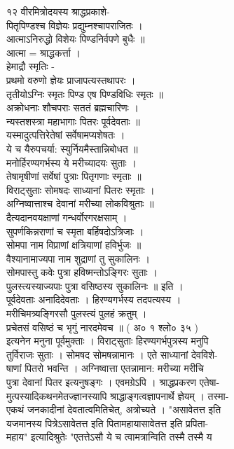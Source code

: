 \documentclass[11pt, openany]{book}
\begin{document}
{{{{{{{{{{{{{{{{{{{{{{{{{{{१२ वीरमित्रोदयस्य श्राद्धप्रकाशे-}{\\
पितृपिण्डश्च विज्ञेयः प्रद्युम्नश्चापराजितः ।\\
आत्माऽनिरुद्धो विशेयः पिण्डनिर्वपणे बुधैः ॥\\
आत्मा = श्राद्धकर्त्ता ।\\
हेमाद्रौ स्मृतिः -\\
प्रथमो वरुणो ज्ञेयः प्राजापत्यस्तथापरः ।\\
तृतीयोऽग्निः स्मृतः पिण्ड एष पिण्डविधिः स्मृतः ॥\\
अक्रोधनाः शौचपराः सततं ब्रह्मचारिणः ।\\
न्यस्तशस्त्रा महाभागाः पितरः पूर्वदेवताः ॥\\
यस्मादुत्पत्तिरेतेषां सर्वेषामप्यशेषतः ।\\
ये }{च}{ यैरुपचर्या: स्युर्नियमैस्तान्निबोधत ॥\\
मनोर्हिरण्यगर्भस्य ये मरीच्यादयः सुताः ।\\
तेषामृषीणां सर्वेषां पुत्राः पितृगणाः स्मृताः ॥\\
विराट्सुताः सोमषदः साध्यानां पितरः स्मृताः ।\\
अग्निष्वात्ताश्च देवानां मरीच्या लोकविश्रुताः ॥\\
दैत्यदानवयक्षाणां गन्धर्वोरगरक्षसाम् ।\\
सुपर्णकिन्नराणां }{च}{ स्मृता बर्हिषदोऽत्रिजाः ।\\
सोमपा नाम विप्राणां क्षत्रियाणां हविर्भुजः ॥\\
वैश्यानामाज्यपा नाम शुद्राणां तु सुकालिनः ।\\
सोमपास्तु कवेः पुत्रा हविष्मन्तोऽङ्गिरः सुताः ।\\
पुलस्त्यस्याज्यपाः पुत्रा वसिष्ठस्य सुकालिनः ॥ इति ।\\
पूर्वदेवताः अनादिदेवताः । हिरण्यगर्भस्य तदपत्यस्य ।\\
मरीचिमत्र्यङ्गिरसौ पुलस्त्यं पुलहं क्रतुम् ।\\
प्रचेतसं वसिष्ठं }{च}{ भृगुं नारदमेवच ॥ ( अ० १ श्लो० ३५ )\\
इत्यनेन मनुना पूर्वमुक्ताः । विराट्सुताः हिरण्यगर्भपुत्रस्य मनुपि\\
तुर्विराजः सुताः । सोमषद सोमषन्नामानः । एते साध्यानां देवविशे-\\
षाणां पितरो भवन्ति । अग्निष्वात्ता एतन्नामान: मरीच्या मरीचि\\
पुत्रा देवानां पितर इत्यनुषङ्गः । एवमग्रेऽपि । श्राद्धप्रकरण एतेषा-\\
मुत्पस्यादिकथनमेतज्ज्ञानस्यापि श्राद्धाङ्गत्वज्ञापनार्थे ज्ञेयम् ।
तस्मा-\\
एकथं जनकादीनां देवतात्वमितिचेत्, अत्रोच्यते । "असावेतत्त इति\\
यजमानस्य पित्रेऽसावेतत्त इति पितामहायासावेतत्त इति प्रपिता-\\
महाय" इत्यादिश्रुतेः "एतत्तेऽसौ ये }{च}{ त्वामत्रान्विति तस्मै तस्मै य\\


}}}}}}}}}}}}}}}}}}}}}}}}}}}
\end{document}
